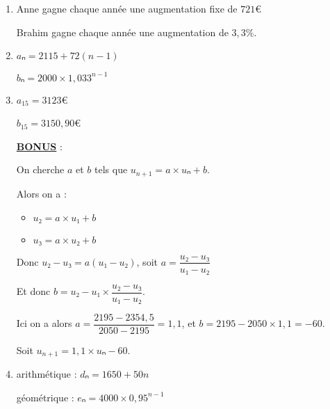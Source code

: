 \documentclass[
	classe=$1^{ere}STI2D$
]{exercice}
\begin{document}
	\begin{enumerate}
		\item Anne gagne chaque année une augmentation fixe de $721$€

		      Brahim gagne chaque année une augmentation de $3,3$\%.
		\item $aₙ = 2115 + 72(n-1)$

		      $bₙ = 2000 × 1,033^{n-1}$
		\item $a_{15} = 3123$€

		      $b_{15} = 3150,90$€


		      \uline{\textbf{BONUS}} :

		      On cherche $a$ et $b$ tels que $u_{n+1} = a×uₙ + b$.

		      Alors on a :
		      \begin{itemize}
			      \item $u₂ = a×u₁ + b$
			      \item $u₃ = a×u₂ + b$
		      \end{itemize}
		      Donc $u₂ - u₃ = a(u₁ - u₂)$, soit $a = \dfrac{u₂ - u₃}{u₁ - u₂}$

		      Et donc $b = u₂ - u₁ × \dfrac{u₂ - u₃}{u₁ - u₂}$.

		      Ici on a alors $a = \dfrac{2195 - 2354,5}{2050 - 2195} = 1,1$, et $b = 2195 - 2050 × 1,1 = -60$.

		      Soit $u_{n+1} = 1,1×uₙ - 60$.
		\item arithmétique : $dₙ = 1650 + 50n$

		      géométrique : $eₙ = 4000 × 0,95^{n - 1}$
	\end{enumerate}
\fi
\end{document}
